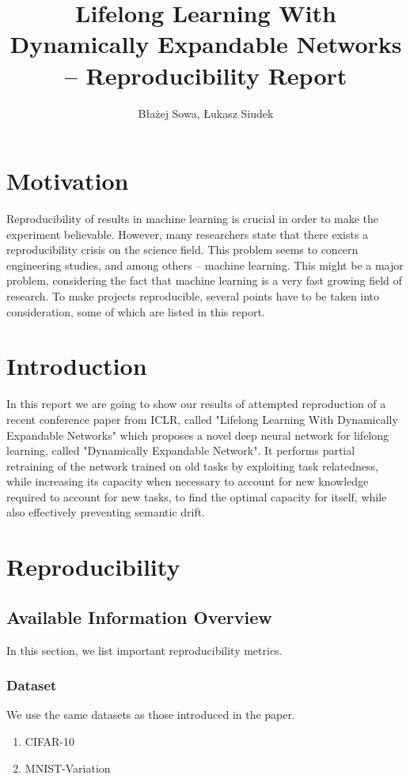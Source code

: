 \documentclass[12pt]{article}
\title{Lifelong Learning With Dynamically Expandable Networks -- Reproducibility Report }
\author{Błażej Sowa, Łukasz Siudek}
\date{}
\begin{document}
    \maketitle
    
    \section {Motivation}

    Reproducibility of results in machine learning is crucial in order to make the experiment believable.
    However, many researchers state that there exists a reproducibility crisis on the science field.
    This problem seems to concern engineering studies, and among others -- machine
    learning. This might be a major problem, considering the fact that machine learning is a very fast
    growing field of research.
    To make projects reproducible, several points have to be taken into consideration, some of which are
    listed in this report.
    
    \section{Introduction}
    
    In this report we are going to show our results of attempted reproduction of a
    recent conference paper from ICLR, called "Lifelong Learning With Dynamically
    Expandable Networks" which proposes a novel deep neural network for lifelong learning, called "Dynamically
    Expandable Network". It performs partial retraining of the network trained on old tasks by exploiting task
    relatedness, while increasing its capacity when necessary to account for new knowledge required
    to account for new tasks, to find the optimal capacity for itself, while also effectively preventing
    semantic drift.
    
    \section {Reproducibility}
    
    \subsection {Available Information Overview}
    
    In this section, we list important reproducibility metrics.  
    
    \subsubsection{Dataset}
    We use the same datasets as those introduced in the paper.
    \begin{enumerate}  
        \item CIFAR-10
        \item MNIST-Variation 
    \end{enumerate}
    
\end{document}
